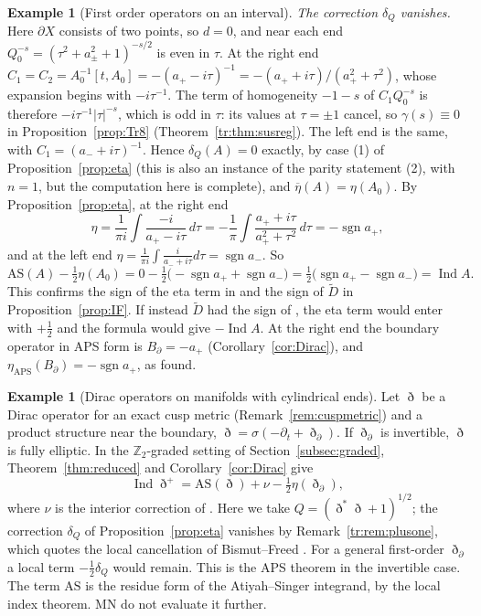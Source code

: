 \documentclass[11pt,oneside,reqno]{article}
\DeclareMathOperator{\Ind}{Ind}
\DeclareMathOperator{\sgn}{sgn}
\newcommand{\AS}{\mathrm{AS}}
\newcommand{\etab}{\overline\eta}
\theoremstyle{plain}
\theoremstyle{definition}
\newtheorem{example}[theorem]{Example}
\theoremstyle{remark}
\begin{document}
\begin{example}[First order operators on an interval]
\emph{The correction \(\delta_Q\) vanishes.} Here \(\partial X\) consists
of two points, so \(d=0\), and near each end \(Q_0^{-s}=(\tau^2+a_\pm^2+
1)^{-s/2}\) is even in \(\tau\). At the right end \(C_1=C_2=
A_0^{-1}[t,A_0]=-(a_+-i\tau)^{-1}=-(a_++i\tau)/(a_+^2+\tau^2)\), whose
expansion begins with \(-i\tau^{-1}\). The term of homogeneity \(-1-s\) of
\(C_1Q_0^{-s}\) is therefore \(-i\tau^{-1}|\tau|^{-s}\), which is odd in
\(\tau\): its values at \(\tau=\pm1\) cancel, so \(\gamma(s)\equiv0\) in
Proposition~\ref{prop:Tr8} (Theorem~\ref{tr:thm:susreg}). The left end is
the same, with \(C_1=(a_-+i\tau)^{-1}\). Hence \(\delta_Q(A)=0\) exactly,
by case (1) of Proposition~\ref{prop:eta} (this is also an instance of the
parity statement (2), with \(n=1\), but the computation here is complete),
and \(\etab(A)=\eta(A_0)\). By Proposition~\ref{prop:eta}, at the right
end
\[
 \eta=\frac1{\pi i}\int\frac{-i}{a_+-i\tau}\,d\tau=-\frac1\pi\int
 \frac{a_++i\tau}{a_+^2+\tau^2}\,d\tau=-\sgn a_+ ,
\]
and at the left end \(\eta=\frac1{\pi i}\int\frac{i}{a_-+i\tau}d\tau=
\sgn a_-\). So
\[
 \AS(A)-\tfrac12\eta(A_0)=0-\tfrac12\bigl(-\sgn a_++\sgn a_-\bigr)
 =\tfrac12\bigl(\sgn a_+-\sgn a_-\bigr)=\Ind A .
\]
This confirms the sign of the eta term in \cite[(93)]{MN} and the sign of
\(\widetilde D\) in Proposition~\ref{prop:IF}. If instead \(\widetilde D\)
had the sign of \cite[(21)]{MN}, the eta term would enter with \(+\frac12\)
and the formula would give \(-\Ind A\). At the right end the boundary
operator in APS form is \(B_\partial=-a_+\) (Corollary~\ref{cor:Dirac}),
and \(\eta_{\mathrm{APS}}(B_\partial)=-\sgn a_+\), as found.
\end{example}

\begin{example}[Dirac operators on manifolds with cylindrical ends]
Let \(\eth\) be a Dirac operator for an exact cusp metric
(Remark~\ref{rem:cuspmetric}) and a product structure near the boundary,
\(\eth=\sigma(-\partial_t+\eth_\partial)\). If \(\eth_\partial\) is
invertible, \(\eth\) is fully elliptic. In the \(\mathbb Z_2\)-graded
setting of Section~\ref{subsec:graded}, Theorem~\ref{thm:reduced} and
Corollary~\ref{cor:Dirac} give
\[
 \Ind\eth^+=\AS(\eth)+\nu-\tfrac12\eta(\eth_\partial),
\]
where \(\nu\) is the interior correction of \cite[(110)]{MN}. Here we take
\(Q=(\eth^*\eth+1)^{1/2}\); the correction \(\delta_Q\) of
Proposition~\ref{prop:eta} vanishes by Remark~\ref{tr:rem:plusone}, which
quotes the local cancellation of Bismut--Freed \cite{BismutFreed}. For a
general first-order \(\eth_\partial\) a local term
\(-\frac12\delta_Q\) would remain. This is the
APS theorem in the invertible case. The term
\(\AS\) is the residue form of the Atiyah--Singer integrand, by the
local index theorem. MN do not evaluate it further.
\end{example}
\end{document}
